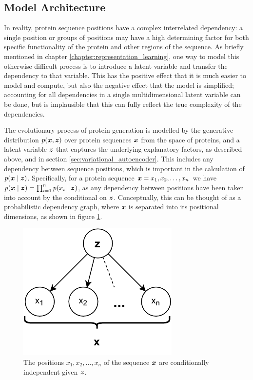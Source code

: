 
\subsection{Model Architecture}

In reality, protein sequence positions have a complex interrelated dependency: a single position or groups of positions may have a high determining factor for both specific functionality of the protein and other regions of the sequence. As briefly mentioned in chapter \ref{chapter:representation_learning}, one way to model this otherwise difficult process is to introduce a latent variable and transfer the dependency to that variable. This has the positive effect that it is much easier to model and compute, but also the negative effect that the model is simplified; accounting for all dependencies in a single multidimensional latent variable can be done, but is implausible that this can fully reflect the true complexity of the dependencies.

The evolutionary process of protein generation is modelled by the generative distribution $p(\bm{ x }, \bm{ z })$ over protein sequences $\bm{ x }$ from the space of proteins, and a latent variable $\bm{ z }$ that captures the underlying explanatory factors, as described above, and in section \ref{sec:variational_autoencoder}. This includes any dependency between sequence positions, which is important in the calculation of $p(\bm{ x } \mid \bm{ z })$. Specifically, for a protein sequence $\bm{ x } = x_1, x_2, \ldots, x_n$ we have $p(\bm{ x } \mid \bm{ z }) = \prod_{i = 1}^n p(x_i \mid \bm{ z })$, as any dependency between positions have been taken into account by the conditional on $\bm{ z }$. Conceptually, this can be thought of as a probabilistic dependency graph, where $\bm{ x }$ is separated into its positional dimensions, as shown in figure \ref{fig:codependency}.
\begin{figure}[H]
    \centering
    \includegraphics{report/figures/codependency.pdf}
    \caption{The positions $x_1, x_2, \ldots, x_n$ of the sequence $\bm{ x }$ are conditionally independent given $\bm{ z }$.}
    \label{fig:codependency}
\end{figure}

